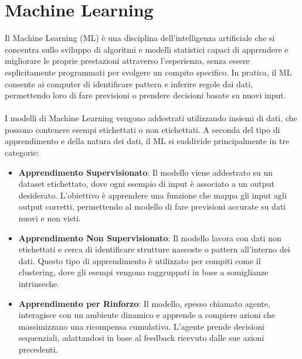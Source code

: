 \documentclass[a4paper, oneside, openright]{report}
\let\oldsection\section
\renewcommand{\section}{\newpage\oldsection}
\begin{document}
\section{Machine Learning}
Il Machine Learning (ML) è una disciplina dell'intelligenza artificiale che si concentra sullo sviluppo di algoritmi e modelli statistici capaci di apprendere e migliorare le proprie prestazioni attraverso l'esperienza, senza essere esplicitamente programmati per svolgere un compito specifico. In pratica, il ML consente ai computer di identificare pattern e inferire regole dai dati, permettendo loro di fare previsioni o prendere decisioni basate su nuovi input.\\ \\
\noindent I modelli di Machine Learning vengono addestrati utilizzando insiemi di dati, che possono contenere esempi etichettati o non etichettati. A seconda del tipo di apprendimento e della natura dei dati, il ML si suddivide principalmente in tre categorie:
\begin{itemize}
    \item \textbf{Apprendimento Supervisionato}: Il modello viene addestrato su un dataset etichettato, dove ogni esempio di input è associato a un output desiderato. L'obiettivo è apprendere una funzione che mappa gli input agli output corretti, permettendo al modello di fare previsioni accurate su dati nuovi e non visti.
    
    \item \textbf{Apprendimento Non Supervisionato}: Il modello lavora con dati non etichettati e cerca di identificare strutture nascoste o pattern all'interno dei dati. Questo tipo di apprendimento è utilizzato per compiti come il clustering, dove gli esempi vengono raggruppati in base a somiglianze intrinseche.

    \item \textbf{Apprendimento per Rinforzo}: Il modello, spesso chiamato agente, interagisce con un ambiente dinamico e apprende a compiere azioni che massimizzano una ricompensa cumulativa. L'agente prende decisioni sequenziali, adattandosi in base al feedback ricevuto dalle sue azioni precedenti.
\end{itemize}
\end{document}
